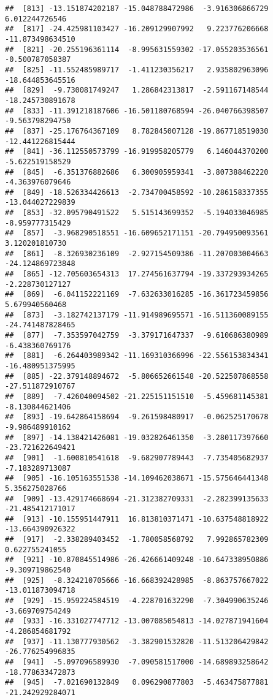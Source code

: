 \documentclass[
]{article}
\begin{document}
\begin{verbatim}
##  [813] -13.151874202187 -15.048788472986  -3.916306866729   6.012244726546
##  [817] -24.425981103427 -16.209129907992   9.223776206668 -11.873498634510
##  [821] -20.255196361114  -8.995631559302 -17.055203536561  -0.500787058387
##  [825] -11.552485989717  -1.411230356217   2.935802963096 -18.644853645516
##  [829]  -9.730081749247   1.286842313817  -2.591167148544 -18.245730891678
##  [833] -11.391218187606 -16.501180768594 -26.040766398507  -9.563798294750
##  [837] -25.176764367109   8.782845007128 -19.867718519030 -12.441226815444
##  [841] -36.112550573799 -16.919958205779   6.146044370200  -5.622519158529
##  [845]  -6.351376882686   6.300905959341  -3.807388462220  -4.363976079646
##  [849] -18.526334426613  -2.734700458592 -10.286158337355 -13.044027229839
##  [853] -32.095790491522   5.515143699352  -5.194033046985  -8.959777315429
##  [857]  -3.968290518551 -16.609652171151 -20.794950093561   3.120201810730
##  [861]  -8.326930236109  -2.927154509386 -11.207003004663 -24.124869723848
##  [865] -12.705603654313  17.274561637794 -19.337293934265  -2.228730127127
##  [869]  -6.041152221169  -7.632633016285 -16.361723459856   5.679940560468
##  [873]  -3.182742137179 -11.914989695571 -16.511360089155 -24.741487828465
##  [877]  -7.353597042759  -3.379171647337  -9.610686380989  -6.438360769176
##  [881]  -6.264403989342 -11.169310366996 -22.556153834341 -16.480951375995
##  [885] -22.379148894672  -5.806652661548 -20.522507868558 -27.511872910767
##  [889]  -7.426040094502 -21.225151151510  -5.459681145381  -8.130844621406
##  [893] -19.642864158694  -9.261598480917  -0.062525170678  -9.986489910162
##  [897] -14.138421426081 -19.032826461350  -3.280117397660 -23.721622649421
##  [901]  -1.600810541618  -9.682907789443  -7.735405682937  -7.183289713087
##  [905] -16.105163551538 -14.109462038671 -15.575646441348   5.356275028766
##  [909] -13.429174668694 -21.312382709331  -2.282399135633 -21.485412171017
##  [913] -10.155951447911  16.813810371471 -10.637548818922 -13.664390926322
##  [917]  -2.338289403452  -1.780058568792   7.992865782309   0.622755241055
##  [921] -10.870845514986 -26.426661409248 -10.647338950886  -9.309719862540
##  [925]  -8.324210705666 -16.668392428985  -8.863757667022 -13.011873094718
##  [929] -15.959224584519  -4.228701632290  -7.304990635246  -3.669709754249
##  [933] -16.331027747712 -13.007085054813 -14.027871941604  -4.286854681792
##  [937] -11.130777930562  -3.382901532820 -11.513206429842 -26.776254996835
##  [941]  -5.097096589930  -7.090581517000 -14.689893258642 -18.778633472873
##  [945]  -7.021690132849   0.096290877803  -5.463475877881 -21.242929284071

\end{verbatim}
\end{document}
